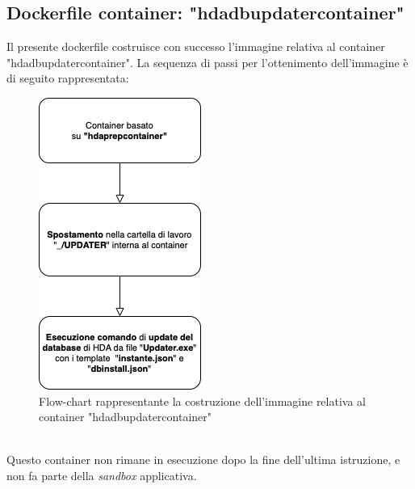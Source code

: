 \subsection{Dockerfile container: "hdadbupdatercontainer"}
Il presente dockerfile costruisce con successo l'immagine relativa al container "hdadbupdatercontainer". La sequenza di passi per l'ottenimento dell'immagine è di seguito rappresentata:
\begin{figure}[!h]     
\centering 
    \includegraphics[width=0.3\columnwidth]{immagini/flowchart/flowchart_hdadbinstall} 
    \caption{Flow-chart rappresentante la costruzione dell'immagine relativa al container "hdadbupdatercontainer"}
\end{figure} \\
Questo container non rimane in esecuzione dopo la fine dell'ultima istruzione, e non fa parte della \textit{sandbox} applicativa.\\
\newpage
